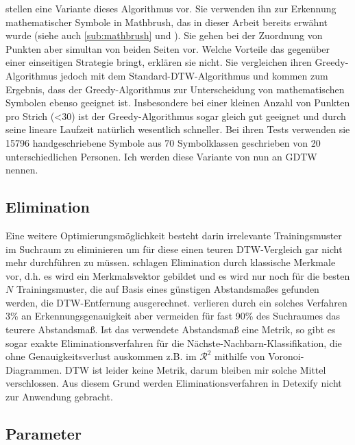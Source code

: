 \citet{MacLean:2010p9970} stellen eine Variante dieses Algorithmus vor. Sie verwenden ihn zur Erkennung mathematischer Symbole in Mathbrush, das in dieser Arbeit bereits erwähnt wurde (siehe auch \ref{sub:mathbrush} und \cite{Labahn:2008p10301}). Sie gehen bei der Zuordnung von Punkten aber simultan von beiden Seiten vor.
Welche Vorteile das gegenüber einer einseitigen Strategie bringt, erklären sie nicht. Sie vergleichen ihren Greedy-Algorithmus jedoch mit dem Standard-DTW-Algorithmus und kommen zum Ergebnis, dass der Greedy-Algorithmus zur Unterscheidung von mathematischen Symbolen ebenso geeignet ist. Insbesondere bei einer kleinen Anzahl von Punkten pro Strich (<30) ist der Greedy-Algorithmus sogar gleich gut geeignet und durch seine lineare Laufzeit natürlich wesentlich schneller. Bei ihren Tests verwenden sie 15796 handgeschriebene Symbole aus 70 Symbolklassen geschrieben von 20 unterschiedlichen Personen.
Ich werden diese Variante von nun an \ac{GDTW} nennen.

\subsection{Elimination}
\label{sub:elimnimation}

Eine weitere Optimierungsmöglichkeit besteht darin irrelevante Trainingsmuster im Suchraum zu eliminieren um für diese einen teuren DTW-Vergleich gar nicht mehr durchführen zu müssen. \citet{Watt:2005p1816} schlagen Elimination durch klassische Merkmale vor, d.h. es wird ein Merkmalsvektor gebildet und es wird nur noch für die besten $N$ Trainingsmuster, die auf Basis eines günstigen Abstandsmaßes gefunden werden, die DTW-Entfernung ausgerechnet. \citet{Watt:2005p1816} verlieren durch ein solches Verfahren 3\% an Erkennungsgenauigkeit aber vermeiden für fast 90\% des Suchraumes das teurere Abstandsmaß.
Ist das verwendete Abstandsmaß eine Metrik, so gibt es sogar exakte Eliminationsverfahren für die Nächste-Nachbarn-Klassifikation, die ohne Genauigkeitsverlust auskommen z.B. im $\mathcal{R}^2$ mithilfe von Voronoi-Diagrammen. DTW ist leider keine Metrik, darum bleiben mir solche Mittel verschlossen.
Aus diesem Grund werden Eliminationsverfahren in Detexify nicht zur Anwendung gebracht.

\subsection{Parameter}
\label{sub:parameter}

